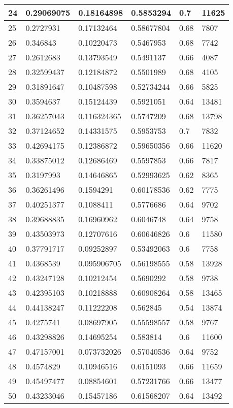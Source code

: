 \begin{longtable}{|l|l|l|l|l|l|}
24 & 0.29069075 & 0.18164898 & 0.5853294 & 0.7 & 11625 \\ \hline 
25 & 0.2727931 & 0.17132464 & 0.58677804 & 0.68 & 7807 \\ \hline 
26 & 0.346843 & 0.10220473 & 0.5467953 & 0.68 & 7742 \\ \hline 
27 & 0.2612683 & 0.13793549 & 0.5491137 & 0.66 & 4087 \\ \hline 
28 & 0.32599437 & 0.12184872 & 0.5501989 & 0.68 & 4105 \\ \hline 
29 & 0.31891647 & 0.10487598 & 0.52734244 & 0.66 & 5825 \\ \hline 
30 & 0.3594637 & 0.15124439 & 0.5921051 & 0.64 & 13481 \\ \hline 
31 & 0.36257043 & 0.116324365 & 0.5747209 & 0.68 & 13798 \\ \hline 
32 & 0.37124652 & 0.14331575 & 0.5953753 & 0.7 & 7832 \\ \hline 
33 & 0.42694175 & 0.12386872 & 0.59650356 & 0.66 & 11620 \\ \hline 
34 & 0.33875012 & 0.12686469 & 0.5597853 & 0.66 & 7817 \\ \hline 
35 & 0.3197993 & 0.14646865 & 0.52993625 & 0.62 & 8365 \\ \hline 
36 & 0.36261496 & 0.1594291 & 0.60178536 & 0.62 & 7775 \\ \hline 
37 & 0.40251377 & 0.1088411 & 0.5776686 & 0.64 & 9702 \\ \hline 
38 & 0.39688835 & 0.16960962 & 0.6046748 & 0.64 & 9758 \\ \hline 
39 & 0.43503973 & 0.12707616 & 0.60646826 & 0.6 & 11580 \\ \hline 
40 & 0.37791717 & 0.09252897 & 0.53492063 & 0.6 & 7758 \\ \hline 
41 & 0.4368539 & 0.095906705 & 0.56198555 & 0.58 & 13928 \\ \hline 
42 & 0.43247128 & 0.10212454 & 0.5690292 & 0.58 & 9738 \\ \hline 
43 & 0.42395103 & 0.10218888 & 0.60908264 & 0.58 & 13465 \\ \hline 
44 & 0.44138247 & 0.11222208 & 0.562845 & 0.54 & 13874 \\ \hline 
45 & 0.4275741 & 0.08697905 & 0.55598557 & 0.58 & 9767 \\ \hline 
46 & 0.43298826 & 0.14695254 & 0.583814 & 0.6 & 11600 \\ \hline 
47 & 0.47157001 & 0.073732026 & 0.57040536 & 0.64 & 9752 \\ \hline 
48 & 0.4574829 & 0.10946516 & 0.6151093 & 0.66 & 11659 \\ \hline 
49 & 0.45497477 & 0.08854601 & 0.57231766 & 0.66 & 13477 \\ \hline 
50 & 0.43233046 & 0.15457186 & 0.61568207 & 0.64 & 13492 \\ \hline 
\end{longtable}